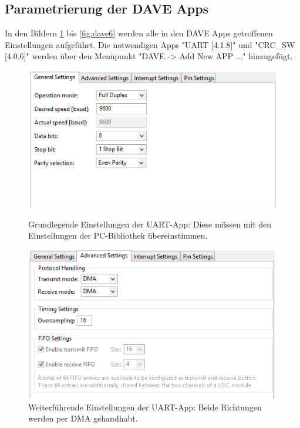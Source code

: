 \subsection{Parametrierung der DAVE Apps}
In den Bildern \ref{fig:dave1} bis \ref{fig:dave6} werden alle in den DAVE Apps getroffenen Einstellungen aufgeführt. Die notwendigen Apps "UART [4.1.8]" und "CRC\_SW [4.0.6]" werden über den Menüpunkt "DAVE -> Add New APP ..." hinzugefügt.
\newpage
\begin{figure}[!h]
  \begin{minipage}{0.45\textwidth}
    \centering
    \includegraphics[width=\textwidth]{UARTgeneralSet}
    \caption{Grundlegende Einstellungen der UART-App: Diese müssen mit den Einstellungen der PC-Bibliothek übereinstimmen.}
    \label{fig:dave1}
  \end{minipage}
  \begin{minipage}{0.45\textwidth}
    \centering
    \includegraphics[width=\textwidth]{UARTadvancedSet}
    \caption{Weiterführende Einstellungen der UART-App: Beide Richtungen werden per DMA gehandhabt.}
  \end{minipage}

\end{figure}

